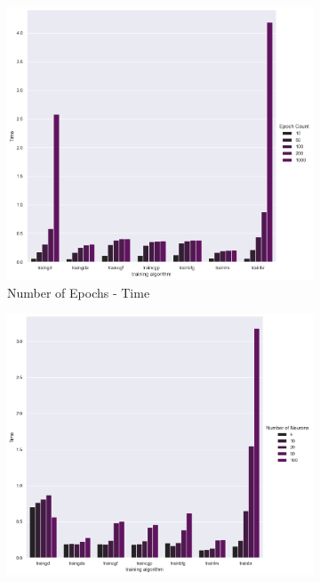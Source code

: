 \documentclass[11pt,conference,compsoc]{IEEEtran}
\begin{document}
\begin{figure}[]

    \begin{subfigure}{0.33\linewidth}
        \includegraphics[width=\linewidth]{images/Epochs-Time.png}
        \caption{Number of Epochs - Time}
    \end{subfigure}
    \begin{subfigure}{0.33\linewidth}
        \includegraphics[width=\linewidth]{images/Neurons-Time.png}

\end{subfigure}
\end{figure}
\end{document}
